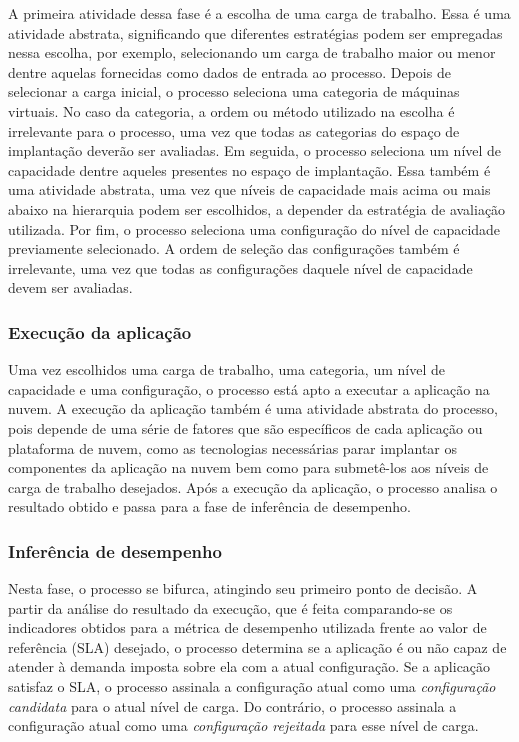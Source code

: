 \documentclass[12pt]{article}
\begin{document}
A primeira atividade dessa fase é a escolha de uma carga de trabalho. Essa é uma atividade abstrata, significando que 
diferentes estratégias podem ser empregadas nessa escolha, por exemplo,
selecionando um carga de trabalho maior ou menor dentre aquelas fornecidas como dados de entrada ao processo. Depois de selecionar a carga inicial, o processo seleciona uma categoria de máquinas virtuais. No caso da categoria, a ordem ou método utilizado na escolha é irrelevante para o processo, uma vez que todas as categorias do espaço de implantação deverão ser avaliadas. Em seguida, o processo seleciona um nível de capacidade dentre aqueles presentes no espaço de implantação. Essa também é uma atividade abstrata, uma vez que níveis de capacidade mais acima ou mais abaixo na hierarquia podem ser escolhidos, a depender da estratégia de avaliação utilizada. Por fim, o processo seleciona uma configuração do nível de capacidade previamente selecionado. A ordem de seleção das configurações também é irrelevante, uma vez que todas as configurações daquele nível de capacidade devem ser avaliadas. 

\subsubsection{Execução da aplicação}

Uma vez escolhidos uma carga de trabalho, uma categoria, um nível de capacidade e uma configuração, o processo está apto a executar a aplicação na nuvem. A execução da aplicação também é uma atividade abstrata do processo, pois depende de uma série de fatores que são específicos de cada aplicação ou plataforma de nuvem, como as tecnologias necessárias parar implantar os componentes da aplicação na nuvem bem como para submetê-los aos níveis de carga de trabalho desejados.  Após a execução da aplicação, o processo analisa o resultado obtido e passa para a fase de inferência de desempenho.

\subsubsection{Inferência de desempenho}

Nesta fase, o processo se bifurca, atingindo seu primeiro ponto de decisão. A partir da análise do resultado da execução, que é feita comparando-se os indicadores obtidos para a métrica de desempenho utilizada frente ao valor de referência (SLA) desejado, o processo determina se a aplicação é ou não capaz de atender à demanda imposta sobre ela com a atual configuração. Se a aplicação satisfaz o SLA, o processo assinala a configuração atual como uma {\em configuração candidata} para o atual nível de carga. Do contrário, o processo assinala a configuração atual como uma {\em configuração rejeitada} para esse nível de carga.
\end{document}
